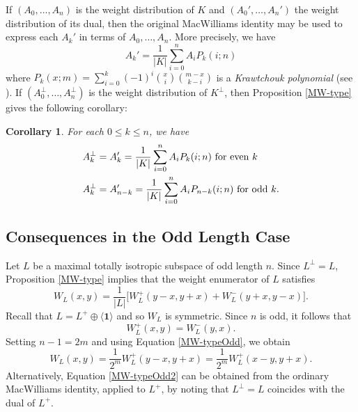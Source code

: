 \documentclass[a4paper,reqno]{amsart}
\newtheorem{corollary}[theorem]{Corollary}
\theoremstyle{definition}
\theoremstyle{remark} \newtheorem{remark}[theorem]{Remark}
\numberwithin{equation}{section}
\begin{document}
If \((A_0,\dots, A_n)\) is the weight distribution of \(K\) and \((A_0',\dots, A_n')\) the weight distribution of its dual, then the original MacWilliams identity may be used to express each \(A_k'\) in terms of \(A_0,\dots, A_n\). More precisely, we have 
\begin{equation*}
    A_k' = \frac{1}{\lvert K \rvert} \sum_{i=0}^n A_i P_k(i;n)
\end{equation*}
where \(P_k(x;m) = \sum_{i=0}^k (-1)^i \binom{x}{i} \binom{m-x}{k-i}\) is a \emph{Krawtchouk polynomial} (see \cite[\S 5]{TOECC}). If \((A_0^\perp,\dots, A_n^\perp)\) is the weight distribution of \(K^\perp\), then Proposition \ref{MW-type} gives the following corollary:

\begin{corollary}
    For each \(0\leq k \leq n\), we have
    \begin{align*}
        A_k^\perp &= A_k' = \frac{1}{\lvert K \rvert} \sum_{i=0}^n A_i P_k(i;n) \textnormal{ for even } k \\
        A_k^\perp &= A_{n-k}' = \frac{1}{\lvert K \rvert} \sum_{i=0}^n A_i P_{n-k}(i;n) \textnormal{ for odd } k.
    \end{align*}
\end{corollary}

\subsection{Consequences in the Odd Length Case}\label{oddConsequences} Let \(L\) be a maximal totally isotropic subspace of odd length \(n\). Since $L^\perp=L$, Proposition \ref{MW-type} implies that the weight enumerator of \(L\) satisfies
\begin{equation}\label{MW-typeOdd}
    W_L(x,y) = \frac{1}{\lvert L \rvert}\bigl[W_L^+(y-x, y+x) + W_L^-(y+x,y-x)\bigr].
\end{equation}
Recall that \(L = L^+ \oplus \langle \textbf{1} \rangle\) and so \(W_L\) is symmetric. Since \(n\) is odd, it follows that 
\begin{equation}\label{symmetry-typeOdd}
W_L^+(x,y) = W_L^-(y,x).
\end{equation}
Setting \(n-1 = 2m\) and using Equation \eqref{MW-typeOdd}, we obtain
\begin{equation}\label{MW-typeOdd2}
    W_L(x,y) = \frac{1}{2^m}W_L^+(y-x, y+x) = \frac{1}{2^m}W_L^+(x-y, y+x).
\end{equation}
Alternatively, Equation \eqref{MW-typeOdd2} can be obtained from the ordinary MacWilliams identity, applied to $L^+$, by noting that \(L^\perp=L\) coincides with the dual of \(L^+\).
\end{document}
